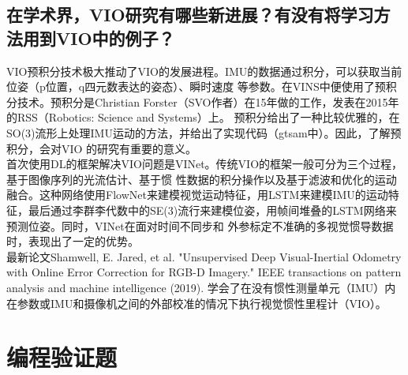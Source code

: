\documentclass[UTF8]{ctexart}
\begin{document}
\subsection{在学术界，VIO研究有哪些新进展？有没有将学习方法用到VIO中的例子？}
\indent VIO预积分技术极大推动了VIO的发展进程。IMU的数据通过积分，可以获取当前位姿（p位置，q四元数表达的姿态）、瞬时速度
等参数。在VINS中便使用了预积分技术。预积分是Christian Forster（SVO作者）在15年做的工作，发表在2015年的RSS（Robotics: Science and Systems）上。
预积分给出了一种比较优雅的，在SO(3)流形上处理IMU运动的方法，并给出了实现代码（gtsam中）。因此，了解预积分，会对VIO
的研究有重要的意义。\\
\indent 首次使用DL的框架解决VIO问题是VINet。传统VIO的框架一般可分为三个过程，基于图像序列的光流估计、基于惯
性数据的积分操作以及基于滤波和优化的运动融合。这种网络使用FlowNet来建模视觉运动特征，用LSTM来建模IMU的运动特
征，最后通过李群李代数中的SE(3)流行来建模位姿，用帧间堆叠的LSTM网络来预测位姿。同时，VINet在面对时间不同步和
外参标定不准确的多视觉惯导数据时，表现出了一定的优势。\\
\indent 最新论文Shamwell, E. Jared, et al. "Unsupervised Deep Visual-Inertial Odometry with Online 
Error Correction for RGB-D Imagery." IEEE transactions on pattern analysis and machine intelligence (2019).
学会了在没有惯性测量单元（IMU）内在参数或IMU和摄像机之间的外部校准的情况下执行视觉惯性里程计（VIO）。\\

\newpage
\section{编程验证题}
\end{document}
